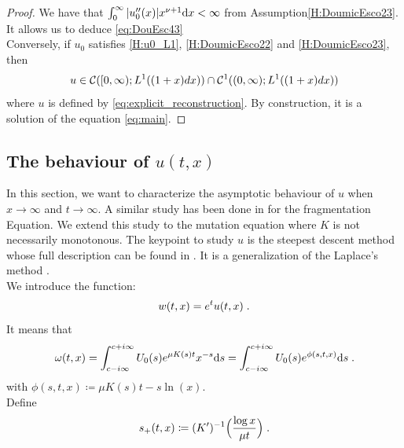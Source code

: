 \documentclass[11pt]{amsart}
\begin{document}
\begin{proof}
    We have that $\int_0^\infty |u_0''(x)| x^{\nu + 1} \mathrm dx < \infty$ from Assumption\eqref{H:DoumicEsco23}. It allows us to deduce \eqref{eq:DouEsc43} \\
    
    Conversely, if $u_0$ satisfies \eqref{H:u0_L1}, \eqref{H:DoumicEsco22} and \eqref{H:DoumicEsco23}, then 
     $$u \in \mathcal{C}([0, \infty); L^1((1+x)dx)) \cap \mathcal{C}^1((0, \infty); L^1((1+x)dx))$$
    where $u$ is defined by \eqref{eq:explicit_reconstruction}. By construction, it is a solution of the equation \eqref{eq:main}.
    \end{proof}

\subsection{The behaviour of $u(t,x)$}\mbox{}

In this section, we want to characterize the asymptotic behaviour of $u$ when $x \to \infty$ and $t \to \infty$. A similar study has been done in \cite{doumic2016time} for the fragmentation Equation. We extend this study to the mutation equation where $K$ is not necessarily monotonous.
The keypoint to study $u$ is the steepest descent method whose full description can be found in \cite{dieudonne1980calcul,debye1909naherungsformeln}. It is a generalization of the Laplace's method \cite{laplace1986memoir}. \\

We introduce the function: 
    \begin{align*}
        w(t,x) = e^t u(t,x)
        \; .
    \end{align*}
It means that
    \begin{equation*}
        \omega(t,x)
        = \int_{c-i\infty}^{c+i\infty} U_0(s) e^{\mu K(s)t}x^{-s} \mathrm ds
        =  \int_{c-i\infty}^{c+i\infty} U_0(s) e^{\phi(s, t, x)} \mathrm ds
        \; .
    \end{equation*}
with $\phi(s,t,x) \coloneqq \mu K(s) t - s \ln(x) $.\\


Define $$ s_+(t,x) \coloneqq (K')^{-1} \Big( \frac{\log x}{\mu t} \Big) \; .$$
\end{document}
